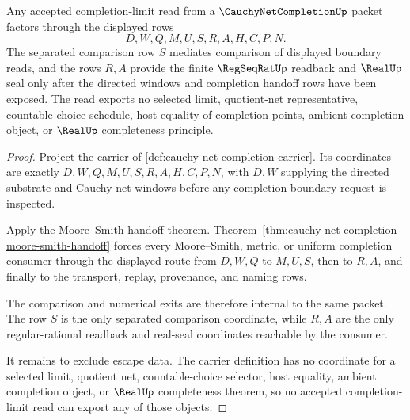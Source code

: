 \begin{theorem}
\label{thm:cauchy-net-completion-choice-free-limit-boundary}
Any accepted completion-limit read from a $\CauchyNetCompletionUp$ packet factors through the displayed rows
$$
D,W,Q,M,U,S,R,A,H,C,P,N .
$$
The separated comparison row $S$ mediates comparison of displayed boundary reads, and the rows $R,A$ provide the finite $\RegSeqRatUp$ readback and $\RealUp$ seal only after the directed windows and completion handoff rows have been exposed. The read exports no selected limit, quotient-net representative, countable-choice schedule, host equality of completion points, ambient completion object, or $\RealUp$ completeness principle.
\end{theorem}
\begin{proof}
Project the carrier of \autoref{def:cauchy-net-completion-carrier}. Its coordinates are exactly $D,W,Q,M,U,S,R,A,H,C,P,N$, with $D,W$ supplying the directed substrate and Cauchy-net windows before any completion-boundary request is inspected.

Apply the Moore--Smith handoff theorem. Theorem~\ref{thm:cauchy-net-completion-moore-smith-handoff} forces every Moore--Smith, metric, or uniform completion consumer through the displayed route from $D,W,Q$ to $M,U,S$, then to $R,A$, and finally to the transport, replay, provenance, and naming rows.

The comparison and numerical exits are therefore internal to the same packet. The row $S$ is the only separated comparison coordinate, while $R,A$ are the only regular-rational readback and real-seal coordinates reachable by the consumer.

It remains to exclude escape data. The carrier definition has no coordinate for a selected limit, quotient net, countable-choice selector, host equality, ambient completion object, or $\RealUp$ completeness theorem, so no accepted completion-limit read can export any of those objects.
\end{proof}

